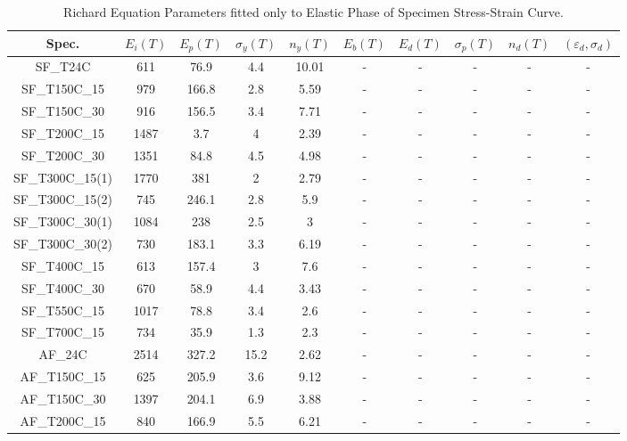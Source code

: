 \documentclass[review]{elsarticle}
\begin{document}
{\begin{landscape}
\begin{table}[htbp]
	\centering
	\caption{Richard Equation Parameters fitted only to Elastic Phase of Specimen Stress-Strain Curve.}
	\begin{tabular}{cccccccccc}
		\toprule
		Spec. &   $E_i(T)$    &   $E_p(T)$    &  $\sigma_y(T)$     &   $n_y(T)$     &    $E_b(T)$   &    $E_d(T)$   &   $\sigma_p(T)$    &   $n_d(T)$    &  $(\varepsilon_d,\sigma_d)$\\
		\midrule
		SF\_T24C & 611   & 76.9  & 4.4   & 10.01 & -     & -     & -     & -     & - \\
		SF\_T150C\_15 & 979   & 166.8 & 2.8   & 5.59  & -     & -     & -     & -     & - \\
		SF\_T150C\_30 & 916   & 156.5 & 3.4   & 7.71  & -     & -     & -     & -     & - \\
		SF\_T200C\_15 & 1487  & 3.7   & 4     & 2.39  & -     & -     & -     & -     & - \\
		SF\_T200C\_30 & 1351  & 84.8  & 4.5   & 4.98  & -     & -     & -     & -     & - \\
		SF\_T300C\_15(1) & 1770  & 381   & 2     & 2.79  & -     & -     & -     & -     & - \\
		SF\_T300C\_15(2) & 745   & 246.1 & 2.8   & 5.9   & -     & -     & -     & -     & - \\
		SF\_T300C\_30(1) & 1084  & 238   & 2.5   & 3     & -     & -     & -     & -     & - \\
		SF\_T300C\_30(2) & 730   & 183.1 & 3.3   & 6.19  & -     & -     & -     & -     & - \\
		SF\_T400C\_15 & 613   & 157.4 & 3     & 7.6   & -     & -     & -     & -     & - \\
		SF\_T400C\_30 & 670   & 58.9  & 4.4   & 3.43  & -     & -     & -     & -     & - \\
		SF\_T550C\_15 & 1017  & 78.8  & 3.4   & 2.6   & -     & -     & -     & -     & - \\
		SF\_T700C\_15 & 734   & 35.9  & 1.3   & 2.3   & -     & -     & -     & -     & - \\
		AF\_24C & 2514  & 327.2 & 15.2  & 2.62  & -     & -     & -     & -     & - \\
		AF\_T150C\_15 & 625   & 205.9 & 3.6   & 9.12  & -     & -     & -     & -     & - \\
		AF\_T150C\_30 & 1397  & 204.1 & 6.9   & 3.88  & -     & -     & -     & -     & - \\
		AF\_T200C\_15 & 840   & 166.9 & 5.5   & 6.21  & -     & -     & -     & -     & - \\

\end{tabular}
\end{table}
\end{landscape}}
\end{document}
